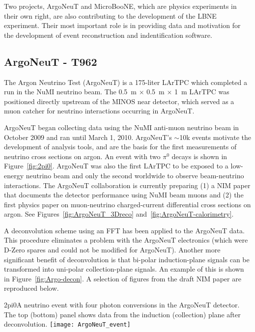 Two projects, ArgoNeuT and MicroBooNE,  which are physics experiments in their own right, are also contributing to the development of the LBNE experiment. Their most important role is in providing data and motivation for the development of event reconstruction and indentification software.

\subsection{ArgoNeuT - T962}
The Argon Neutrino Test (ArgoNeuT) is a 175-liter LArTPC which completed a run in the NuMI neutrino beam.  The 0.5~m $\times$ 0.5~m $\times$ 1~m LArTPC was positioned directly upstream of the MINOS near detector, which served as a muon catcher for neutrino interactions occurring in ArgoNeuT. 

ArgoNeuT began collecting data using the NuMI anti-muon neutrino beam in October 2009 and ran until  March 1, 2010.  ArgoNeuT's $\sim$10k events motivate the development of analysis tools, and are the basis for the first measurements of neutrino cross sections on argon.   An event with two $\pi^{0}$ decays is shown in Figure~\ref{fig:2pi0}.   ArgoNeuT was also the first LArTPC to be exposed to a low-energy neutrino beam and only the second worldwide to observe beam-neutrino interactions. The ArgoNeuT collaboration is currently preparing (1) a NIM paper that documents the detector performance using NuMI beam muons and (2) the first physics paper on muon-neutrino charged-current differential cross sections on argon.  See Figures~\ref{fig:ArgoNeuT_3Dreco} and~\ref{fig:ArgoNeuT-calorimetry}.

A deconvolution scheme using an FFT has been applied to the ArgoNeuT data. This procedure eliminates a problem with the ArgoNeuT electronics (which were D-Zero spares and could not be modified for ArgoNeuT). Another more significant benefit of deconvolution is that bi-polar induction-plane signals can be transformed into uni-polar collection-plane signals. An example of this is shown in Figure~\ref{fig:Argo-decon}. A selection of figures from the draft NIM paper are reproduced below.


\begin{cdrfigure}{2pi0}{A neutrino event with four photon conversions in the ArgoNeuT detector. The top (bottom) panel shows data from the induction (collection) plane after deconvolution.}
\texttt{[image: ArgoNeuT\_event]}
\end{cdrfigure}


